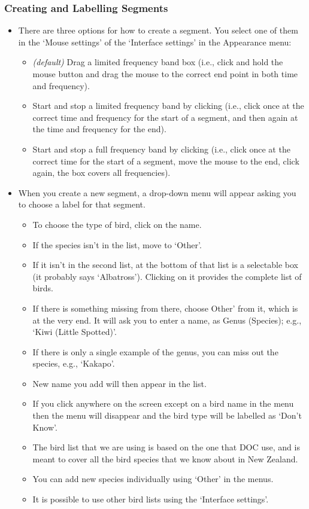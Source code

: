 \documentclass{article}
\begin{document}
\subsubsection*{Creating and Labelling Segments}

\begin{itemize}
\item There are three options for how to create a segment. You select one of them in the `Mouse settings' of the `Interface settings' in the Appearance menu:
	\begin{itemize}
	\item {\em (default)} Drag a limited frequency band box (i.e., click and hold the mouse button and drag the mouse to the correct end point in both time and frequency).
	\item Start and stop a limited frequency band by clicking (i.e., click once at the correct time and frequency for the start of a segment, and then again at the time and frequency for the end).
	\item Start and stop a full frequency band by clicking (i.e., click once at the correct time for the start of a segment, move the mouse to the end, click again, the box covers all frequencies).
	\end{itemize}
	
\item When you create a new segment, a drop-down menu will appear asking you to choose a label for that segment. 

\begin{itemize}
\item To choose the type of bird, click on the name. 
\item If the species isn't in the list, move to `Other'. 
\item If it isn't in the second list, at the bottom of that list is a selectable box (it probably says `Albatross'). Clicking on it provides the complete list of birds. 
\item If there is something missing from there, choose Other' from it, which is at the very end. It will ask you to enter a name, as Genus (Species); e.g., `Kiwi (Little Spotted)'. 
\item If there is only a single example of the genus, you can miss out the species, e.g., `Kakapo'. 
\item New name you add will then appear in the list. 
\item If you click anywhere on the screen except on a bird name in the menu then the menu will disappear and the bird type will be labelled as `Don't Know'. 
\item The bird list that we are using is based on the one that DOC use, and is meant to cover all the bird species that we know about in New Zealand. 
\item You can add new species individually using `Other' in the menus.
\item It is possible to use other bird lists using the `Interface settings'.  
\end{itemize}


\end{itemize}
\end{document}
